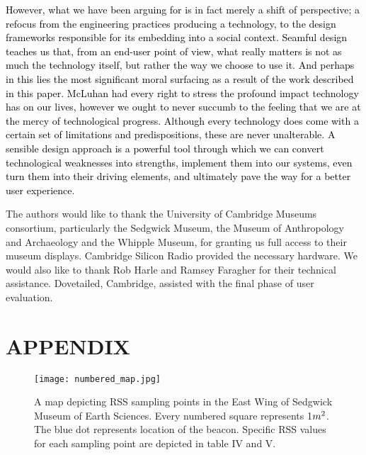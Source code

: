 \documentclass[prodmode,acmtomm]{acmsmall}
\begin{document}
\textcolor{black}{However, what we have been arguing for is in fact merely a shift of perspective; a refocus from the engineering practices producing a technology, to the design frameworks responsible for its embedding into a social context. Seamful design teaches us that, from an end-user point of view, what really matters is not as much the technology itself, but rather the way we choose to use it. And perhaps in this lies the most significant moral surfacing as a result of the work described in this paper. McLuhan had every right to stress the profound impact technology has on our lives,  however we ought to never succumb to the feeling that we are at the mercy of technological progress. Although every technology does come with a certain set of limitations and predispositions, these are never unalterable. A sensible design approach is a powerful tool through which we can convert technological weaknesses into strengths, implement them into our systems, even turn them into their driving elements, and ultimately pave the way for a better user experience.} 

\begin{acks}
The authors would like to thank the University of Cambridge Museums consortium, particularly the Sedgwick Museum, the Museum of Anthropology and Archaeology and the Whipple Museum, for granting us full access to their museum displays. Cambridge Silicon Radio provided the necessary hardware. We would also like to thank Rob Harle and Ramsey Faragher for their technical assistance. Dovetailed, Cambridge, assisted with the final phase of user evaluation. \end{acks}

\hfill


\vspace{-12pt}



\hfill
\hfill
\appendix
\section*{APPENDIX}
\setcounter{section}{1}



\begin{figure}[h!]
\begin{center}
\begin{center}
\texttt{[image: numbered\_map.jpg]}
\end{center}
\caption{A map depicting RSS sampling points in the East Wing of Sedgwick Museum of Earth Sciences. Every numbered square represents 1$m\textsuperscript{2}$. The blue dot represents location of the beacon. Specific RSS values for each sampling point are depicted in table IV and V.}
\end{center}
\end{figure}
\end{document}
